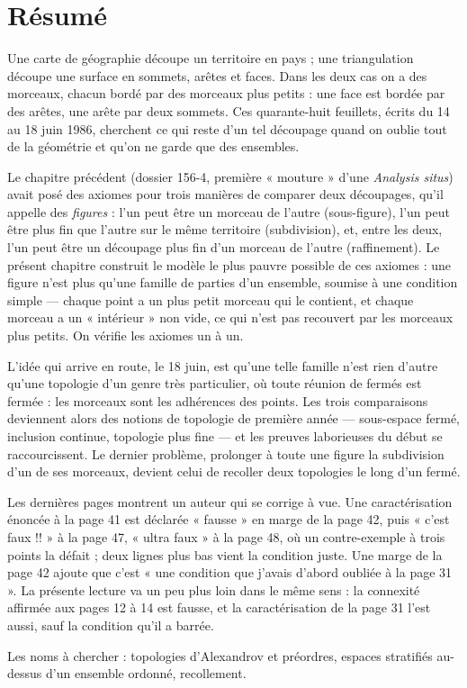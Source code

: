 \documentclass[11pt,a4paper]{article}
\begin{document}
\section*{Résumé}

\begin{resume}
Une carte de géographie découpe un territoire en pays ; une triangulation
découpe une surface en sommets, arêtes et faces. Dans les deux cas on a des
morceaux, chacun bordé par des morceaux plus petits : une face est bordée par
des arêtes, une arête par deux sommets. Ces quarante-huit feuillets, écrits du
14 au 18 juin 1986, cherchent ce qui reste d'un tel découpage quand on oublie
tout de la géométrie et qu'on ne garde que des ensembles.

Le chapitre précédent (dossier 156-4, première « mouture » d'une
\emph{Analysis situs}) avait posé des axiomes pour trois manières de comparer
deux découpages, qu'il appelle des \emph{figures} : l'un peut être un morceau
de l'autre (sous-figure), l'un peut être plus fin que l'autre sur le même
territoire (subdivision), et, entre les deux, l'un peut être un découpage plus
fin d'un morceau de l'autre (raffinement). Le présent chapitre construit le
modèle le plus pauvre possible de ces axiomes : une figure n'est plus qu'une
famille de parties d'un ensemble, soumise à une condition simple --- chaque
point a un plus petit morceau qui le contient, et chaque morceau a un
« intérieur » non vide, ce qui n'est pas recouvert par les morceaux plus
petits. On vérifie les axiomes un à un.

L'idée qui arrive en route, le 18 juin, est qu'une telle famille n'est rien
d'autre qu'une topologie d'un genre très particulier, où toute réunion de
fermés est fermée : les morceaux sont les adhérences des points. Les trois
comparaisons deviennent alors des notions de topologie de première année ---
sous-espace fermé, inclusion continue, topologie plus fine --- et les preuves
laborieuses du début se raccourcissent. Le dernier problème, prolonger à toute
une figure la subdivision d'un de ses morceaux, devient celui de recoller deux
topologies le long d'un fermé.

Les dernières pages montrent un auteur qui se corrige à vue. Une
caractérisation énoncée à la page 41 est déclarée « fausse » en marge de la page
42, puis « c'est faux !! » à la page 47, « ultra faux » à la page 48, où un
contre-exemple à trois points la défait ; deux lignes plus bas vient la
condition juste. Une marge de la page 42 ajoute que c'est « une condition que
j'avais d'abord oubliée à la page 31 ». La présente lecture va un peu plus loin
dans le même sens : la connexité affirmée aux pages 12 à 14 est fausse, et la
caractérisation de la page 31 l'est aussi, sauf la condition qu'il a barrée.

Les noms à chercher : topologies d'Alexandrov et préordres, espaces stratifiés
au-dessus d'un ensemble ordonné, recollement.

\end{resume}
\end{document}
